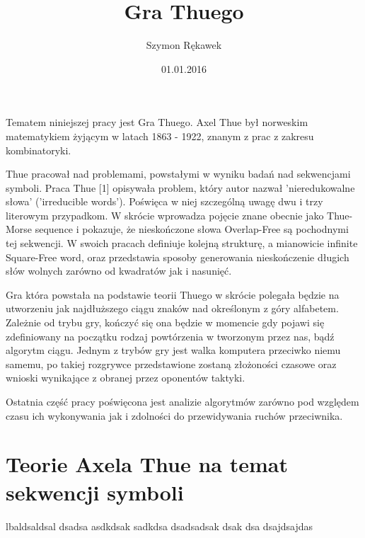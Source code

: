 \documentclass[document]{xmgr}
\author   {Szymon Rękawek}
\title    {Gra Thuego}
\date     {01.01.2016}
\begin{document}
\begin{abstract}

\end{abstract}


\maketitle

\introduction

Tematem niniejszej pracy jest Gra Thuego. Axel Thue był norweskim matematykiem żyjącym w latach 1863 - 1922, znanym z prac z zakresu kombinatoryki.

Thue pracował nad problemami, powstałymi w wyniku badań nad sekwencjami symboli. Praca Thue [1] opisywała problem, który autor nazwał 'nieredukowalne słowa' ('irreducible words'). Poświęca w niej szczególną uwagę dwu i trzy literowym przypadkom. W skrócie wprowadza pojęcie znane obecnie jako Thue-Morse sequence i pokazuje, że nieskończone słowa Overlap-Free są pochodnymi tej sekwencji. W swoich pracach definiuje kolejną strukturę, a mianowicie infinite Square-Free word, oraz przedstawia sposoby generowania nieskończenie długich słów wolnych zarówno od kwadratów jak i nasunięć.

Gra która powstała na podstawie teorii Thuego w skrócie polegała będzie na utworzeniu jak najdłuższego ciągu znaków nad określonym z góry alfabetem. Zależnie od trybu gry, kończyć się ona będzie w momencie gdy pojawi się zdefiniowany na początku rodzaj powtórzenia w tworzonym przez nas, bądź algorytm ciągu. Jednym z trybów gry jest walka komputera przeciwko niemu samemu, po takiej rozgrywce przedstawione zostaną złożoności czasowe oraz wnioski wynikające z obranej przez oponentów taktyki. 

Ostatnia część pracy poświęcona jest analizie algorytmów zarówno pod względem czasu ich wykonywania jak i zdolności do przewidywania ruchów przeciwnika.

\chapter{Teorie Axela Thue na temat sekwencji symboli}
lbaldsaldsal dsadsa asdkdsak sadkdsa dsadsadsak dsak 
dsa dsajdsajdas 
\end{document}
